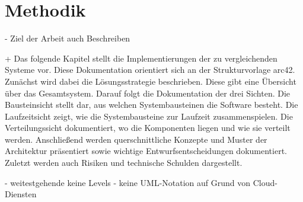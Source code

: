 \section{Methodik}

- Ziel der Arbeit auch Beschreiben


+
Das folgende Kapitel stellt die Implementierungen der zu vergleichenden Systeme vor. Diese Dokumentation orientiert sich an der Strukturvorlage arc42\autocite{starke2007strukturvorlage}. Zunächst wird dabei die Lösungsstrategie beschrieben. Diese gibt eine Übersicht über das Gesamtsystem. Darauf folgt die Dokumentation der drei Sichten. Die Bausteinsicht stellt dar, aus welchen Systembausteinen die Software besteht. Die Laufzeitsicht zeigt, wie die Systembausteine zur Laufzeit zusammenspielen. Die Verteilungssicht dokumentiert, wo die Komponenten liegen und wie sie verteilt werden. Anschließend werden querschnittliche Konzepte und Muster der Architektur präsentiert sowie wichtige Entwurfsentscheidungen dokumentiert. Zuletzt werden auch Risiken und technische Schulden dargestellt.

- weitestgehende keine Levels
- keine UML-Notation auf Grund von Cloud-Diensten
